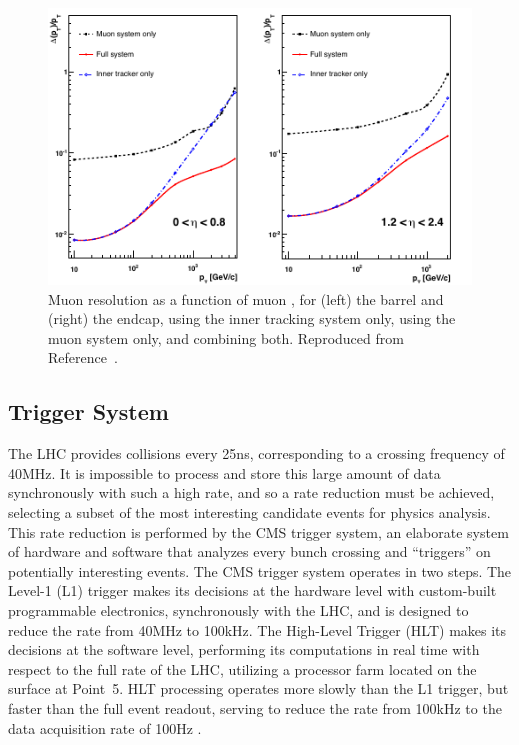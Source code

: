 \begin{figure}[tpb]
  \centering
  \includegraphics[width=\textwidth]{figures/cms/MuonMomentumResolution.pdf}
  \caption[Muon \pT resolution as a function of muon \pT for the barrel and endcap using the tracking system only, muon system only, and combining both.]{Muon \pT resolution as a function of muon \pT, for (left) the barrel and (right) the endcap, using the inner tracking system only, using the muon system only, and combining both. Reproduced from Reference~\cite{Chatrchyan:2008zzk}.}
  \label{cms:muonpT}
\end{figure}

\subsection{Trigger System}
\label{cms:trigger}
The LHC provides \pp collisions every 25\unit{ns}, corresponding to a crossing frequency of 40\unit{MHz}.
It is impossible to process and store this large amount of data synchronously with such a high rate, and so a rate reduction must be achieved, selecting a subset of the most interesting candidate events for physics analysis.
This rate reduction is performed by the CMS trigger system, an elaborate system of hardware and software that analyzes every bunch crossing and ``triggers'' on potentially interesting events.
The CMS trigger system operates in two steps.
The Level-1 (L1) trigger makes its decisions at the hardware level with custom-built programmable electronics, synchronously with the LHC, and is designed to reduce the rate from 40\unit{MHz} to 100\unit{kHz}.
The High-Level Trigger (HLT) makes its decisions at the software level, performing its computations in real time with respect to the full rate of the LHC, utilizing a processor farm located on the surface at Point~5.
HLT processing operates more slowly than the L1 trigger, but faster than the full event readout, serving to reduce the rate from 100\unit{kHz} to the data acquisition rate of 100\unit{Hz} \cite{Chatrchyan:2008zzk, Adam:2005zf}.

